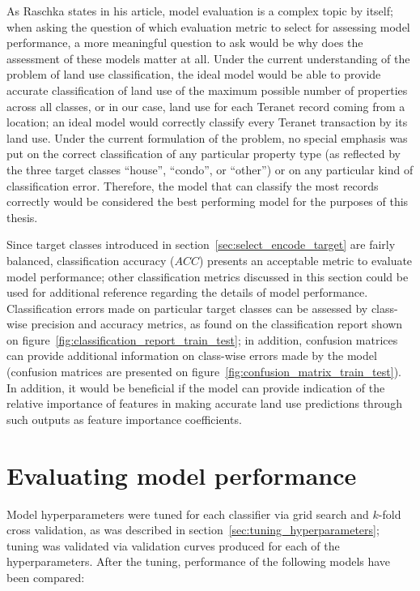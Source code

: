 As Raschka states in his article\cite{Raschka2018}, model evaluation is a complex topic by itself;
when asking the question of which evaluation metric to select for assessing model performance, a more meaningful question to ask would be why does the assessment of these models matter at all.
Under the current understanding of the problem of land use classification, the ideal model would be able to provide accurate classification of land use of the maximum possible number of properties across all classes, or in our case, land use for each Teranet record coming from a location;
an ideal model would correctly classify every Teranet transaction by its land use.
Under the current formulation of the problem, no special emphasis was put on the correct classification of any particular property type (as reflected by the three target classes ``house'', ``condo'', or ``other'') or on any particular kind of classification error.
Therefore, the model that can classify the most records correctly would be considered the best performing model for the purposes of this thesis.

Since target classes introduced in section~\ref{sec:select_encode_target} are fairly balanced, classification accuracy ($ACC$) presents an acceptable metric to evaluate model performance;
other classification metrics discussed in this section could be used for additional reference regarding the details of model performance.
Classification errors made on particular target classes can be assessed by class-wise precision and accuracy metrics, as found on the classification report shown on figure~\ref{fig:classification_report_train_test};
in addition, confusion matrices can provide additional information on class-wise errors made by the model (confusion matrices are presented on figure~\ref{fig:confusion_matrix_train_test}).
In addition, it would be beneficial if the model can provide indication of the relative importance of features in making accurate land use predictions through such outputs as feature importance coefficients.

\section{Evaluating model performance} \label{sec:model_performance}

Model hyperparameters were tuned for each classifier via grid search and $k$-fold cross validation, as was described in section~\ref{sec:tuning_hyperparameters};
tuning was validated via validation curves produced for each of the hyperparameters.
After the tuning, performance of the following models have been compared:

